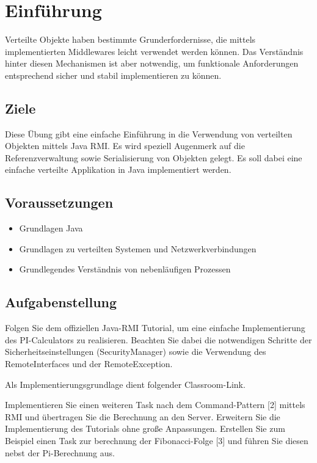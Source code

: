 
\section{Einführung}
Verteilte Objekte haben bestimmte Grunderfordernisse, die mittels implementierten Middlewares leicht verwendet werden können. Das Verständnis hinter diesen Mechanismen ist aber notwendig, um funktionale Anforderungen entsprechend sicher und stabil implementieren zu können.

\subsection{Ziele}
Diese Übung gibt eine einfache Einführung in die Verwendung von verteilten Objekten mittels Java RMI. Es wird speziell Augenmerk auf die Referenzverwaltung sowie Serialisierung von Objekten gelegt. Es soll dabei eine einfache verteilte Applikation in Java implementiert werden.




\subsection{Voraussetzungen}
\begin{itemize}
	\item Grundlagen Java
	\item Grundlagen zu verteilten Systemen und Netzwerkverbindungen
	\item Grundlegendes Verständnis von nebenläufigen Prozessen
\end{itemize}

\subsection{Aufgabenstellung}
Folgen Sie dem offiziellen Java-RMI Tutorial, um eine einfache Implementierung des PI-Calculators zu realisieren. Beachten Sie dabei die notwendigen Schritte der Sicherheitseinstellungen (SecurityManager) sowie die Verwendung des RemoteInterfaces und der RemoteException.

Als Implementierungsgrundlage dient folgender Classroom-Link.

Implementieren Sie einen weiteren Task nach dem Command-Pattern [2] mittels RMI und übertragen Sie die Berechnung an den Server. Erweitern Sie die Implementierung des Tutorials ohne große Anpassungen. Erstellen Sie zum Beispiel einen Task zur berechnung der Fibonacci-Folge [3] und führen Sie diesen nebst der Pi-Berechnung aus.

